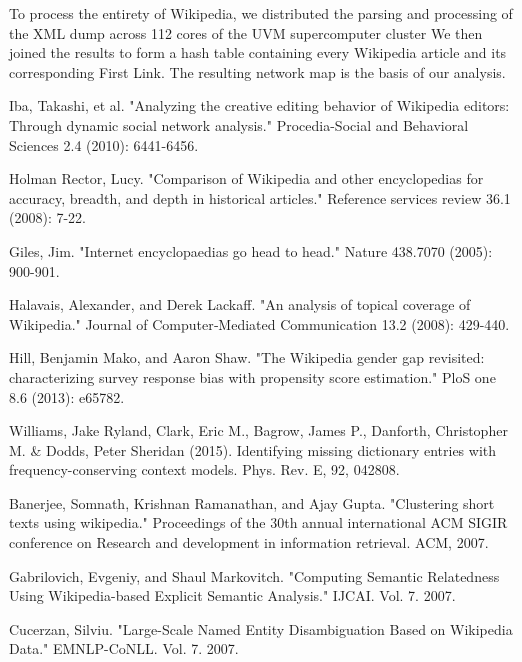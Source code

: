 \documentclass[pre,twocolumn,twoside,superscriptaddress,floatfix, aps, 10pt]{revtex4-1}
\begin{document}
To process the entirety of Wikipedia, we distributed the parsing and processing of the XML dump
across 112 cores of the UVM supercomputer cluster
\cite{vacc}
We then joined the results to form a hash table containing every Wikipedia article and its corresponding
First Link. The resulting network map is the basis of our analysis.





\begin{thebibliography}{1}

       Iba, Takashi, et al. "Analyzing the creative editing behavior of Wikipedia editors: Through dynamic social network analysis." Procedia-Social and Behavioral Sciences 2.4 (2010): 6441-6456.

       Holman Rector, Lucy. "Comparison of Wikipedia and other encyclopedias for accuracy, breadth, and depth in historical articles." Reference services review 36.1 (2008): 7-22.

       Giles, Jim. "Internet encyclopaedias go head to head." Nature 438.7070 (2005): 900-901.

        Halavais, Alexander, and Derek Lackaff. "An analysis of topical coverage of Wikipedia." Journal of Computer‐Mediated Communication 13.2 (2008): 429-440.

         Hill, Benjamin Mako, and Aaron Shaw. "The Wikipedia gender gap revisited: characterizing survey response bias with propensity score estimation." PloS one 8.6 (2013): e65782.

       Williams, Jake Ryland, Clark, Eric M., Bagrow, James P., Danforth, Christopher M. \& Dodds, Peter Sheridan (2015). Identifying missing dictionary entries with frequency-conserving context models. Phys. Rev. E, 92, 042808.

       Banerjee, Somnath, Krishnan Ramanathan, and Ajay Gupta. "Clustering short texts using wikipedia." Proceedings of the 30th annual international ACM SIGIR conference on Research and development in information retrieval. ACM, 2007.

       Gabrilovich, Evgeniy, and Shaul Markovitch. "Computing Semantic Relatedness Using Wikipedia-based Explicit Semantic Analysis." IJCAI. Vol. 7. 2007.

       Cucerzan, Silviu. "Large-Scale Named Entity Disambiguation Based on Wikipedia Data." EMNLP-CoNLL. Vol. 7. 2007.


\end{thebibliography}
\end{document}
